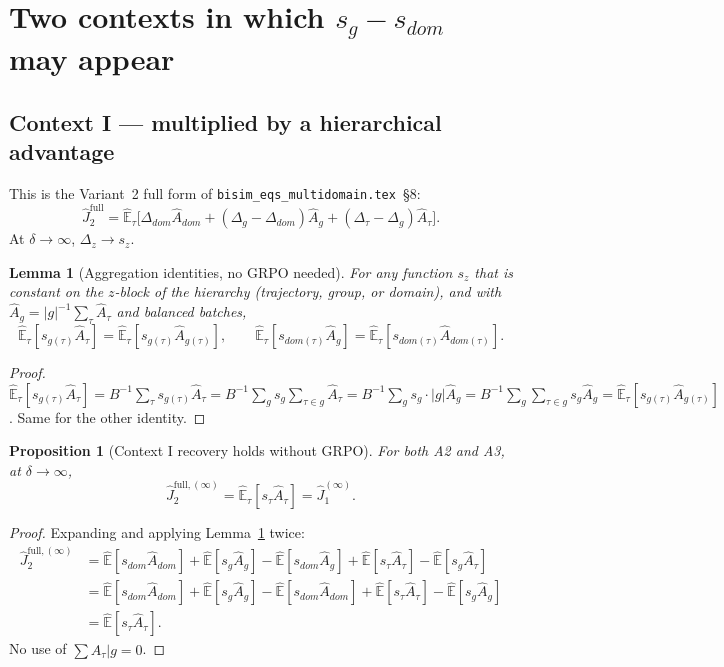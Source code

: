 \documentclass[11pt]{article}
\newcommand{\Ehat}{\widehat{\mathbb{E}}}
\newtheorem{lemma}{Lemma}
\newtheorem{proposition}{Proposition}
\begin{document}
\section{Two contexts in which $s_g - s_{dom}$ may appear}

\subsection*{Context I --- multiplied by a hierarchical advantage}

This is the Variant~2 full form of \texttt{bisim\_eqs\_multidomain.tex}~\S8:
\[
\hat J_2^{\text{full}}
  = \Ehat_\tau\bigl[\Delta_{dom}\hat A_{dom}
       + (\Delta_g-\Delta_{dom})\hat A_g
       + (\Delta_\tau-\Delta_g)\hat A_\tau\bigr].
\]
At $\delta\to\infty$, $\Delta_z\to s_z$.

\begin{lemma}[Aggregation identities, no GRPO needed]
\label{lem:agg}
For any function $s_z$ that is constant on the $z$-block of the hierarchy
(trajectory, group, or domain), and with $\hat A_g=|g|^{-1}\sum_\tau\hat A_\tau$
and balanced batches,
\[
\Ehat_\tau[s_{g(\tau)}\hat A_\tau]
  = \Ehat_\tau[s_{g(\tau)}\hat A_{g(\tau)}],
\qquad
\Ehat_\tau[s_{dom(\tau)}\hat A_g]
  = \Ehat_\tau[s_{dom(\tau)}\hat A_{dom(\tau)}].
\]
\end{lemma}

\begin{proof}
$\Ehat_\tau[s_{g(\tau)}\hat A_\tau] = B^{-1}\sum_\tau s_{g(\tau)}\hat A_\tau
= B^{-1}\sum_g s_g\sum_{\tau\in g}\hat A_\tau = B^{-1}\sum_g s_g\cdot|g|\hat A_g
= B^{-1}\sum_g\sum_{\tau\in g}s_g\hat A_g = \Ehat_\tau[s_{g(\tau)}\hat A_{g(\tau)}]$.
Same for the other identity.
\end{proof}

\begin{proposition}[Context I recovery holds without GRPO]
\label{prop:ctx1}
For both A2 and A3, at $\delta\to\infty$,
\[
\hat J_2^{\text{full},(\infty)}
  = \Ehat_\tau[s_\tau\hat A_\tau]
  = \hat J_1^{(\infty)}.
\]
\end{proposition}

\begin{proof}
Expanding and applying Lemma~\ref{lem:agg} twice:
\begin{align*}
\hat J_2^{\text{full},(\infty)}
  &= \Ehat[s_{dom}\hat A_{dom}]
   + \Ehat[s_g\hat A_g] - \Ehat[s_{dom}\hat A_g]
   + \Ehat[s_\tau\hat A_\tau] - \Ehat[s_g\hat A_\tau] \\
  &= \Ehat[s_{dom}\hat A_{dom}]
   + \Ehat[s_g\hat A_g] - \Ehat[s_{dom}\hat A_{dom}]
   + \Ehat[s_\tau\hat A_\tau] - \Ehat[s_g\hat A_g] \\
  &= \Ehat[s_\tau\hat A_\tau].
\end{align*}
No use of $\sum\hat A_\tau|g = 0$.
\end{proof}
\end{document}
